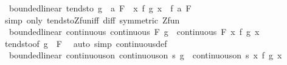 \begin{isabellebody}
\endisatagproof
{\isafoldproof}%
%
\isadelimproof
\isanewline
%
\endisadelimproof
\isanewline
{}\isamarkupfalse%
\ {\isacharparenleft}{\kern0pt}\ bounded{\isacharunderscore}{\kern0pt}linear{\isacharparenright}{\kern0pt}\ tendsto{\isacharcolon}{\kern0pt}\ {\isachardoublequoteopen}{\isacharparenleft}{\kern0pt}g\ {\isasymlonglongrightarrow}\ a{\isacharparenright}{\kern0pt}\ F\ {\isasymLongrightarrow}\ {\isacharparenleft}{\kern0pt}{\isacharparenleft}{\kern0pt}{\isasymlambda}x{\isachardot}{\kern0pt}\ f\ {\isacharparenleft}{\kern0pt}g\ x{\isacharparenright}{\kern0pt}{\isacharparenright}{\kern0pt}\ {\isasymlonglongrightarrow}\ f\ a{\isacharparenright}{\kern0pt}\ F{\isachardoublequoteclose}\isanewline
%
\isadelimproof
\ \ %
\endisadelimproof
%
\isatagproof
{}\isamarkupfalse%
\ {\isacharparenleft}{\kern0pt}simp\ only{\isacharcolon}{\kern0pt}\ tendsto{\isacharunderscore}{\kern0pt}Zfun{\isacharunderscore}{\kern0pt}iff\ diff\ {\isacharbrackleft}{\kern0pt}symmetric{\isacharbrackright}{\kern0pt}\ Zfun{\isacharparenright}{\kern0pt}%
\endisatagproof
{\isafoldproof}%
%
\isadelimproof
\isanewline
%
\endisadelimproof
\isanewline
{}\isamarkupfalse%
\ {\isacharparenleft}{\kern0pt}\ bounded{\isacharunderscore}{\kern0pt}linear{\isacharparenright}{\kern0pt}\ continuous{\isacharcolon}{\kern0pt}\ {\isachardoublequoteopen}continuous\ F\ g\ {\isasymLongrightarrow}\ continuous\ F\ {\isacharparenleft}{\kern0pt}{\isasymlambda}x{\isachardot}{\kern0pt}\ f\ {\isacharparenleft}{\kern0pt}g\ x{\isacharparenright}{\kern0pt}{\isacharparenright}{\kern0pt}{\isachardoublequoteclose}\isanewline
%
\isadelimproof
\ \ %
\endisadelimproof
%
\isatagproof
{}\isamarkupfalse%
\ tendsto{\isacharbrackleft}{\kern0pt}of\ g\ {\isacharunderscore}{\kern0pt}\ F{\isacharbrackright}{\kern0pt}\ \isamarkupfalse%
\ {\isacharparenleft}{\kern0pt}auto\ simp{\isacharcolon}{\kern0pt}\ continuous{\isacharunderscore}{\kern0pt}def{\isacharparenright}{\kern0pt}%
\endisatagproof
{\isafoldproof}%
%
\isadelimproof
\isanewline
%
\endisadelimproof
\isanewline
{}\isamarkupfalse%
\ {\isacharparenleft}{\kern0pt}\ bounded{\isacharunderscore}{\kern0pt}linear{\isacharparenright}{\kern0pt}\ continuous{\isacharunderscore}{\kern0pt}on{\isacharcolon}{\kern0pt}\ {\isachardoublequoteopen}continuous{\isacharunderscore}{\kern0pt}on\ s\ g\ {\isasymLongrightarrow}\ continuous{\isacharunderscore}{\kern0pt}on\ s\ {\isacharparenleft}{\kern0pt}{\isasymlambda}x{\isachardot}{\kern0pt}\ f\ {\isacharparenleft}{\kern0pt}g\ x{\isacharparenright}{\kern0pt}{\isacharparenright}{\kern0pt}{\isachardoublequoteclose}\isanewline

\end{isabellebody}
